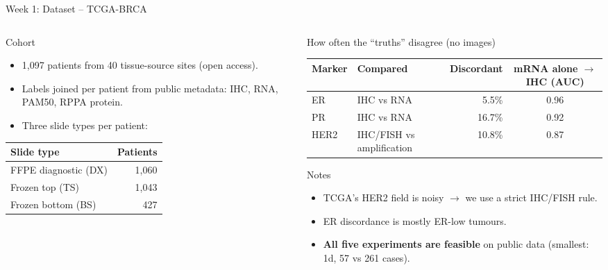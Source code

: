\documentclass[aspectratio=169,10pt]{beamer}
\begin{document}
\begin{frame}[t]{Week 1: Dataset -- TCGA-BRCA}
\footnotesize
\begin{columns}[T]
\begin{column}{0.44\textwidth}
\begin{block}{Cohort}
\begin{itemize}
  \item 1,097 patients from 40 tissue-source sites (open access).
  \item Labels joined per patient from public metadata: IHC, RNA, PAM50, RPPA protein.
  \item Three slide types per patient:
\end{itemize}
\end{block}
\centering
\begin{tabular}{lr}
\toprule
Slide type & Patients \\
\midrule
FFPE diagnostic (DX) & 1,060 \\
Frozen top (TS) & 1,043 \\
Frozen bottom (BS) & 427 \\
\bottomrule
\end{tabular}
\end{column}
\begin{column}{0.52\textwidth}
\begin{block}{How often the ``truths'' disagree (no images)}
\centering
\scriptsize
\begin{tabular}{llrc}
\toprule
Marker & Compared & Discordant & mRNA alone $\rightarrow$ IHC (AUC) \\
\midrule
ER & IHC vs RNA & 5.5\% & 0.96 \\
PR & IHC vs RNA & 16.7\% & 0.92 \\
HER2 & IHC/FISH vs amplification & 10.8\% & 0.87 \\
\bottomrule
\end{tabular}
\end{block}
\begin{block}{Notes}
\begin{itemize}
  \item TCGA's HER2 field is noisy $\rightarrow$ we use a strict IHC/FISH rule.
  \item ER discordance is mostly ER-low tumours.
  \item \textbf{All five experiments are feasible} on public data (smallest: 1d, 57 vs 261 cases).
\end{itemize}
\end{block}
\end{column}
\end{columns}
\end{frame}
\end{document}
